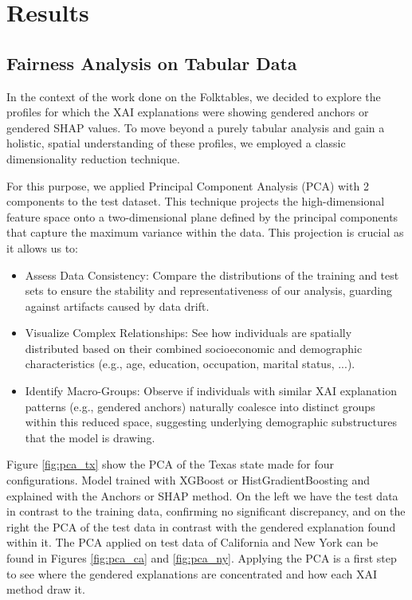 \section{Results}
\subsection{Fairness Analysis on Tabular Data}
In the context of the work done on the Folktables, we decided to explore the profiles for which the XAI explanations were showing gendered anchors or gendered SHAP values. To move beyond a purely tabular analysis and gain a holistic, spatial understanding of these profiles, we employed a classic dimensionality reduction technique.

For this purpose, we applied Principal Component Analysis (PCA) \cite{pca-mackiewicz} with 2 components to the test dataset. This technique projects the high-dimensional feature space onto a two-dimensional plane defined by the principal components that capture the maximum variance within the data. This projection is crucial as it allows us to:

\begin{itemize}
    \item Assess Data Consistency: Compare the distributions of the training and test sets to ensure the stability and representativeness of our analysis, guarding against artifacts caused by data drift.

    \item Visualize Complex Relationships: See how individuals are spatially distributed based on their combined socioeconomic and demographic characteristics (e.g., age, education, occupation, marital status, ...).
    
    \item Identify Macro-Groups: Observe if individuals with similar XAI explanation patterns (e.g., gendered anchors) naturally coalesce into distinct groups within this reduced space, suggesting underlying demographic substructures that the model is drawing.
\end{itemize}


Figure \ref{fig:pca_tx} show the PCA of the Texas state made for four configurations. Model trained with XGBoost or HistGradientBoosting and explained with the Anchors or SHAP method.
On the left we have the test data in contrast to the training data, confirming no significant discrepancy, and on the right the PCA of the test data in contrast with the gendered explanation found within it. The PCA applied on test data of California and New York can be found in Figures \ref{fig:pca_ca} and \ref{fig:pca_ny}. Applying the PCA is a first step to see where the gendered explanations are concentrated and how each XAI method draw it.

